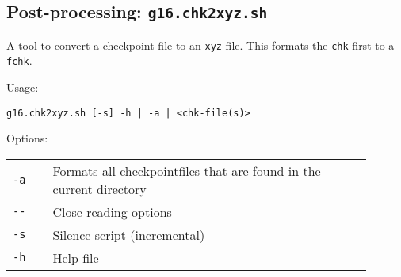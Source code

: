 \documentclass[   %
  final,          %
  a4paper         %
]{article}
\begin{document}
\subsection{Post-processing: \texorpdfstring{{\lstinline`g16.chk2xyz.sh`}}{g16.chk2xyz.sh}}

A tool to convert a checkpoint file to an \texttt{xyz} file. 
This formats the \texttt{chk} first to a \texttt{fchk}.

Usage: 

\lstinline`g16.chk2xyz.sh [-s] -h | -a | <chk-file(s)>`

Options:

\begin{tabular}{p{0.1\linewidth}p{0.8\linewidth}}
  {\lstinline`-a`} & Formats all checkpointfiles that are found in the current directory \\
  {\lstinline`--`} & Close reading options \\
  {\lstinline`-s`} & Silence script (incremental) \\
  {\lstinline`-h`} & Help file  \\
\end{tabular}
\end{document}
